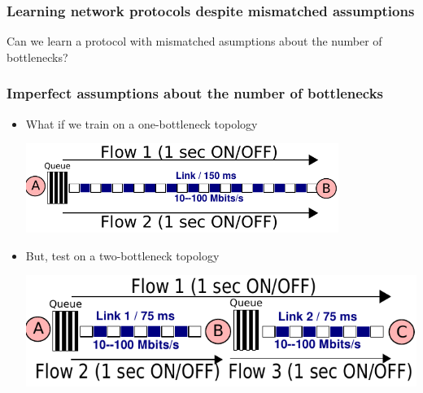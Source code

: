 \begin{frame}
\frametitle{Learning network protocols despite mismatched assumptions}
\begin{centering}
Can we learn a protocol with mismatched asumptions about the number of bottlenecks?
\end{centering}
\end{frame}

\begin{frame}
\frametitle{Imperfect assumptions about the number of bottlenecks}
\large
\begin{centering}

\begin{itemize}
\item<2-> What if we train on a one-bottleneck topology\\
\begin{centering}
\includegraphics[width=0.8\textwidth]{onelink.pdf}
\end{centering}
\item<3-> But, test on a two-bottleneck topology\\
\begin{centering}
\includegraphics[width=0.8 \textwidth]{twolink.pdf}
\end{centering}
\end{itemize}
\end{centering}
\end{frame}

